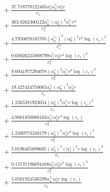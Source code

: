 \documentclass[10pt]{article}
\begin{document}
\begin{align*}
&{}  + \frac{37.718778122465 \alpha_{1}^s \alpha_{2}^{c_s} \alpha_{2}^s r}{c_{s}} \\
&{}  + \frac{303.8262300122 \alpha_{0}^{c_s} \left(\alpha_{0}^s\right)^{2} \alpha_{1}^{c_s} r^{4}}{c_{s}^{4}} \\
&{}  + \frac{4.7950678185705 \left(\alpha_{0}^{c_s}\right)^{3} \left(\alpha_{0}^s\right)^{3} r^{3} \log{\left(c_{s} \right)}^{3}}{c_{s}^{3}} \\
&{}  + \frac{0.60026235808799 \alpha_{1}^{c_s} \alpha_{2}^s r^{4} \log{\left(c_{s} \right)}^{2}}{c_{s}^{4}} \\
&{}  + \frac{9.6041977294078 \left(\alpha_{0}^s\right)^{3} \alpha_{1}^{c_s} r^{4} \log{\left(c_{s} \right)}^{2}}{c_{s}^{4}} \\
&{}  + \frac{19.427434750065 \alpha_{0}^{c_s} \left(\alpha_{0}^s\right)^{3} \alpha_{3}^s r}{c_{s}} \\
&{}  + \frac{1.2365281923054 \left(\alpha_{0}^s\right)^{6} \alpha_{1}^{c_s} r \log{\left(c_{s} \right)}^{2}}{c_{s}} \\
&{}  + \frac{4.9861850088163 \alpha_{2}^{c_s} \alpha_{2}^s r^{3} \log{\left(c_{s} \right)}}{c_{s}^{3}} \\
&{}  + \frac{1.2480773240179 \left(\alpha_{0}^s\right)^{2} \alpha_{4}^s r^{2} \log{\left(c_{s} \right)}^{3}}{c_{s}^{2}} \\
&{}  + \frac{5.0196405698605 \left(\alpha_{0}^s\right)^{2} \left(\alpha_{2}^s\right)^{2} r \log{\left(c_{s} \right)}^{3}}{c_{s}} \\
&{}  + \frac{0.15737196694168 \alpha_{1}^{c_s} \alpha_{3}^s r^{3} \log{\left(c_{s} \right)}^{3}}{c_{s}^{3}} \\
&{}  + \frac{5.0501924536599 \alpha_{3}^{c_s} \alpha_{3}^s r \log{\left(c_{s} \right)}}{c_{s}}
\end{align*}
\end{document}
